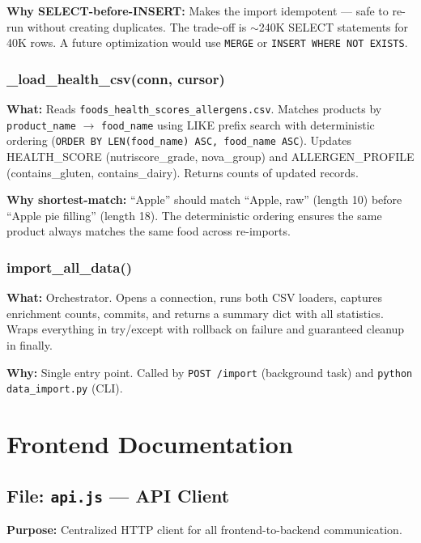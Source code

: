 \documentclass[12pt,a4paper]{article}
\begin{document}
\textbf{Why SELECT-before-INSERT:} Makes the import idempotent — safe to re-run without creating duplicates. The trade-off is $\sim$240K SELECT statements for 40K rows. A future optimization would use \texttt{MERGE} or \texttt{INSERT WHERE NOT EXISTS}.

\subsubsection{\_load\_health\_csv(conn, cursor)}
\textbf{What:} Reads \texttt{foods\_health\_scores\_allergens.csv}. Matches products by \texttt{product\_name} $\rightarrow$ \texttt{food\_name} using LIKE prefix search with deterministic ordering (\texttt{ORDER BY LEN(food\_name) ASC, food\_name ASC}). Updates HEALTH\_SCORE (nutriscore\_grade, nova\_group) and ALLERGEN\_PROFILE (contains\_gluten, contains\_dairy). Returns counts of updated records.

\textbf{Why shortest-match:} ``Apple'' should match ``Apple, raw'' (length 10) before ``Apple pie filling'' (length 18). The deterministic ordering ensures the same product always matches the same food across re-imports.

\subsubsection{import\_all\_data()}
\textbf{What:} Orchestrator. Opens a connection, runs both CSV loaders, captures enrichment counts, commits, and returns a summary dict with all statistics. Wraps everything in try/except with rollback on failure and guaranteed cleanup in finally.

\textbf{Why:} Single entry point. Called by \texttt{POST /import} (background task) and \texttt{python data\_import.py} (CLI).

\section{Frontend Documentation}

\subsection{File: \texttt{api.js} — API Client}

\textbf{Purpose:} Centralized HTTP client for all frontend-to-backend communication.
\end{document}
